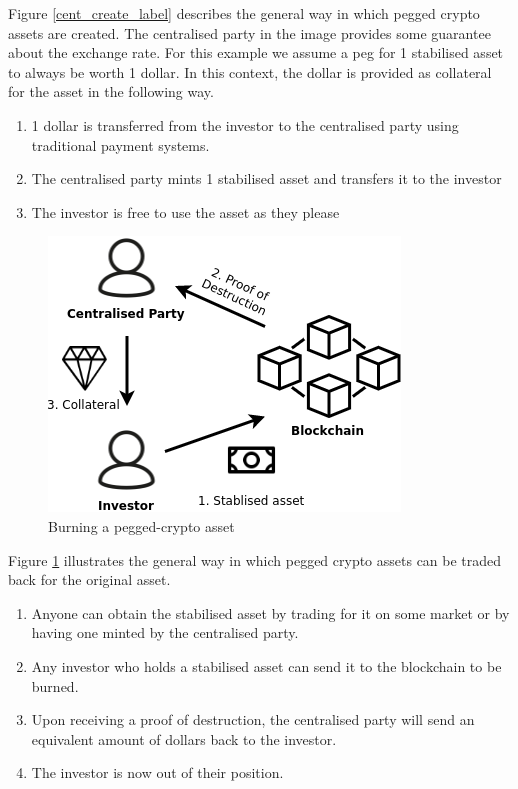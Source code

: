 \documentclass[english,]{IEEEtran}
\providecommand{\tightlist}{%
  \setlength{\itemsep}{0pt}\setlength{\parskip}{0pt}}
\begin{document}
Figure \ref{cent_create_label} describes the general way in which pegged
crypto assets are created. The centralised party in the image provides
some guarantee about the exchange rate. For this example we assume a peg
for 1 stabilised asset to always be worth 1 dollar. In this context, the
dollar is provided as collateral for the asset in the following way.

\begin{enumerate}
\def\labelenumi{\arabic{enumi}.}
\tightlist
\item
  1 dollar is transferred from the investor to the centralised party
  using traditional payment systems.
\item
  The centralised party mints 1 stabilised asset and transfers it to the
  investor
\item
  The investor is free to use the asset as they please
\end{enumerate}

\begin{figure}[htbp]
\centering
\includegraphics{img/Centralised_destroy.png}
\caption{Burning a pegged-crypto asset \label{cent_destoy_label}}
\end{figure}

Figure \ref{cent_destoy_label} illustrates the general way in which
pegged crypto assets can be traded back for the original asset.

\begin{enumerate}
\def\labelenumi{\arabic{enumi}.}
\setcounter{enumi}{-1}
\tightlist
\item
  Anyone can obtain the stabilised asset by trading for it on some
  market or by having one minted by the centralised party.
\item
  Any investor who holds a stabilised asset can send it to the
  blockchain to be burned.
\item
  Upon receiving a proof of destruction, the centralised party will send
  an equivalent amount of dollars back to the investor.
\item
  The investor is now out of their position.
\end{enumerate}
\end{document}
